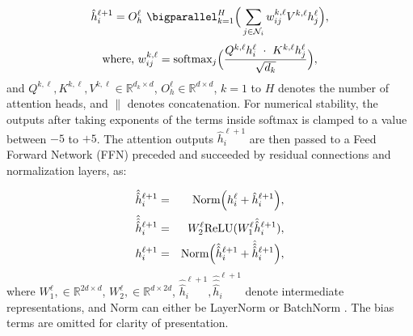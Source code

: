 \documentclass[letterpaper]{article}
\begin{document}
\begin{equation}
    \label{eqn:gt_layer}
    \hat{h}_{i}^{\ell+1} = O_h^{\ell} \ \bigparallel_{k=1}^{H} \Big(\sum_{j \in \mathcal{N}_i} w_{ij}^{k,\ell} V^{k,\ell}h_j^{\ell} \Big),
\end{equation}
\begin{equation}
    \label{eqn:softmax}
    \textnormal{where,} \ w_{ij}^{k,\ell} = \textnormal{softmax}_j \Big(\frac{Q^{k, \ell} h_i^{\ell} \ \cdot \ K^{k, \ell}h_j^{\ell}}{\sqrt{d_k}}  \Big),
\end{equation}
and $Q^{k,\ell}, K^{k,\ell}, V^{k,\ell} \in \mathbb{R}^{d_k \times d}$, $O_h^{\ell} \in \mathbb{R}^{d \times d}$, $k=1$ to $H$ denotes the number of attention heads, and $\|$ denotes concatenation.
For numerical stability, the outputs after taking exponents of the terms inside softmax is clamped to a value between $-5$ to $+5$.
The attention outputs $\hat{h}_{i}^{\ell+1}$ are then passed to a Feed Forward Network (FFN) preceded and succeeded by residual connections and normalization layers, as:

\begin{eqnarray}
    \hat{\hat{h}}_{i}^{\ell+1} &=& \textnormal{Norm} \Big( h_{i}^{\ell} + \hat{h}_{i}^{\ell+1} \Big), \label{eqn:rc_norm1}\\
    \hat{\hat{\hat{h}}}_{i}^{\ell+1} &=& W_2^{\ell} \textnormal{ReLU}(W_1^{\ell} \hat{\hat{h}}_{i}^{\ell+1}), \label{eqn:ffn}\\
    h_{i}^{\ell+1} &=& \textnormal{Norm} \Big( \hat{\hat{h}}_{i}^{\ell+1} + \hat{\hat{\hat{h}}}_{i}^{\ell+1} \Big), \label{eqn:rc_norm2}
\end{eqnarray}
where $W_1^{\ell}, \in \mathbb{R}^{2d \times d}$, $W_2^{\ell}, \in \mathbb{R}^{d \times 2d}$, $\hat{\hat{h}}_{i}^{\ell+1}, \hat{\hat{\hat{h}}}_{i}^{\ell+1}$ denote intermediate representations, and  Norm can either be LayerNorm\cite{ba2016layer} or BatchNorm \cite{ioffe2015batch}. The bias terms are omitted for clarity of presentation.
\end{document}
